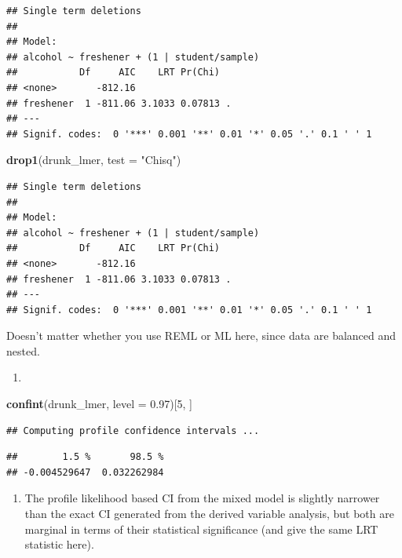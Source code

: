 \documentclass[]{book}
\newenvironment{Shaded}{\begin{snugshade}}{\end{snugshade}}
\newcommand{\KeywordTok}[1]{\textcolor[rgb]{0.13,0.29,0.53}{\textbf{#1}}}
\newcommand{\DataTypeTok}[1]{\textcolor[rgb]{0.13,0.29,0.53}{#1}}
\newcommand{\DecValTok}[1]{\textcolor[rgb]{0.00,0.00,0.81}{#1}}
\newcommand{\FloatTok}[1]{\textcolor[rgb]{0.00,0.00,0.81}{#1}}
\newcommand{\StringTok}[1]{\textcolor[rgb]{0.31,0.60,0.02}{#1}}
\newcommand{\NormalTok}[1]{#1}
\providecommand{\tightlist}{%
  \setlength{\itemsep}{0pt}\setlength{\parskip}{0pt}}
\theoremstyle{definition}
\theoremstyle{definition}
\theoremstyle{definition}
\theoremstyle{remark}
\begin{document}
\begin{verbatim}
## Single term deletions
## 
## Model:
## alcohol ~ freshener + (1 | student/sample)
##           Df     AIC    LRT Pr(Chi)  
## <none>       -812.16                 
## freshener  1 -811.06 3.1033 0.07813 .
## ---
## Signif. codes:  0 '***' 0.001 '**' 0.01 '*' 0.05 '.' 0.1 ' ' 1
\end{verbatim}

\begin{Shaded}
\begin{Highlighting}[]
\KeywordTok{drop1}\NormalTok{(drunk_lmer, }\DataTypeTok{test =} \StringTok{"Chisq"}\NormalTok{)}
\end{Highlighting}
\end{Shaded}

\begin{verbatim}
## Single term deletions
## 
## Model:
## alcohol ~ freshener + (1 | student/sample)
##           Df     AIC    LRT Pr(Chi)  
## <none>       -812.16                 
## freshener  1 -811.06 3.1033 0.07813 .
## ---
## Signif. codes:  0 '***' 0.001 '**' 0.01 '*' 0.05 '.' 0.1 ' ' 1
\end{verbatim}

\normalsize

Doesn't matter whether you use REML or ML here, since data are balanced
and nested.

\begin{enumerate}
\def\labelenumi{\arabic{enumi}.}
\setcounter{enumi}{4}
\item
\end{enumerate}

\small

\begin{Shaded}
\begin{Highlighting}[]
\KeywordTok{confint}\NormalTok{(drunk_lmer, }\DataTypeTok{level =} \FloatTok{0.97}\NormalTok{)[}\DecValTok{5}\NormalTok{, ]}
\end{Highlighting}
\end{Shaded}

\begin{verbatim}
## Computing profile confidence intervals ...
\end{verbatim}

\begin{verbatim}
##        1.5 %       98.5 % 
## -0.004529647  0.032262984
\end{verbatim}

\normalsize

\begin{enumerate}
\def\labelenumi{\arabic{enumi}.}
\setcounter{enumi}{5}
\tightlist
\item
  The profile likelihood based CI from the mixed model is slightly
  narrower than the exact CI generated from the derived variable
  analysis, but both are marginal in terms of their statistical
  significance (and give the same LRT statistic here).
\end{enumerate}
\end{document}
